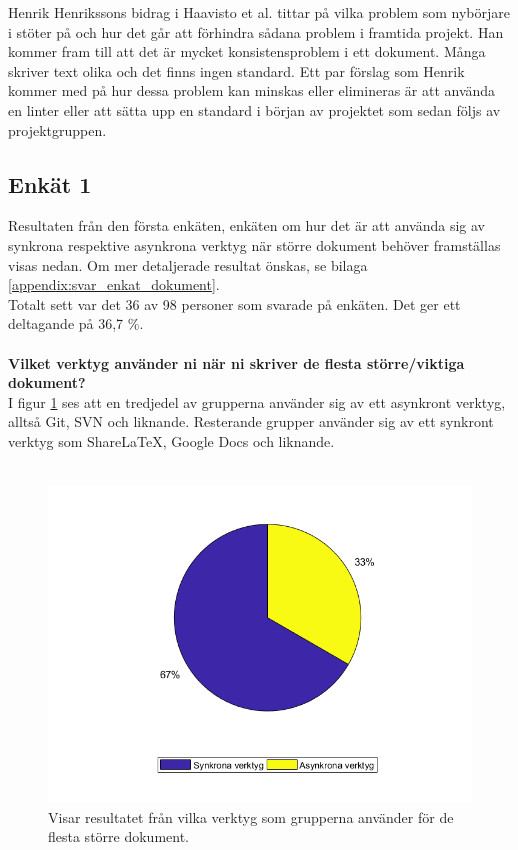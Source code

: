 Henrik Henrikssons bidrag i Haavisto et al. \cite{Haavisto954095} tittar på vilka problem som nybörjare i \latex stöter på och hur det går att förhindra sådana problem i framtida projekt. Han kommer fram till att det är mycket konsistensproblem i ett \latex dokument. Många skriver text olika och det finns ingen standard. Ett par förslag som Henrik kommer med på hur dessa problem kan minskas eller elimineras är att använda en linter eller att sätta upp en standard i början av projektet som sedan följs av projektgruppen.

\subsection{Enkät 1}
Resultaten från den första enkäten, enkäten om hur det är att använda sig av synkrona respektive asynkrona verktyg när större dokument behöver framställas visas nedan. Om mer detaljerade resultat önskas, se bilaga \ref{appendix:svar_enkat_dokument}.\\
Totalt sett var det 36 av 98 personer som svarade på enkäten. Det ger ett deltagande på 36,7 \%.\\
\\\textbf{Vilket verktyg använder ni när ni skriver de flesta större/viktiga dokument?}\\
I figur \ref{fig:most_used_tool} ses att en tredjedel av grupperna använder sig av ett asynkront verktyg, alltså Git, SVN och liknande. Resterande grupper använder sig av ett synkront verktyg som ShareLaTeX, Google Docs och liknande.\\\\

\begin{figure}[H]	
	\includegraphics[scale=0.5]{figures/tool_used_for_documents.png}
	\centering
	\caption{Visar resultatet från vilka verktyg som grupperna använder för de flesta större dokument.}
	\label{fig:most_used_tool}
\end{figure}

